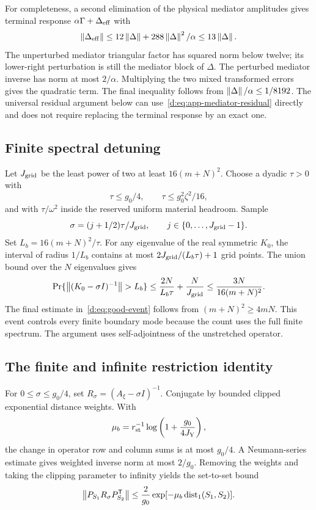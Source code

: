 For completeness, a second elimination of the physical mediator amplitudes gives terminal response $\alpha\Gamma+\Delta_{\rm eff}$ with
\begin{equation}\label{d:eq:app-effective-error}
 \left\lVert \Delta_{\rm eff}\right\rVert
 \le12\left\lVert \Delta\right\rVert+288\left\lVert \Delta\right\rVert^2/\alpha
 \le13\left\lVert \Delta\right\rVert.
\end{equation}
The unperturbed mediator triangular factor has squared norm below twelve; its lower-right perturbation is still the mediator block of $\Delta$. The perturbed mediator inverse has norm at most $2/\alpha$. Multiplying the two mixed transformed errors gives the quadratic term. The final inequality follows from $\left\lVert \Delta\right\rVert/\alpha\le1/8192$. The universal residual argument below can use~\eqref{d:eq:app-mediator-residual} directly and does not require replacing the terminal response by an exact one.

\subsection{Finite spectral detuning}

Let $J_{\rm grid}$ be the least power of two at least $16(m+N)^2$. Choose a dyadic $\tau>0$ with
\[
 \tau\le g_0/4,\qquad \tau\le g_0^2\zeta^2/16,
\]
and with $\tau/\omega^2$ inside the reserved uniform material headroom. Sample
\[
 \sigma=(j+1/2)\tau/J_{\rm grid},\qquad
 j\in\{0,\ldots,J_{\rm grid}-1\}.
\]
Set $L_b=16(m+N)^2/\tau$. For any eigenvalue of the real symmetric $K_0$, the interval of radius $1/L_b$ contains at most $2J_{\rm grid}/(L_b\tau)+1$ grid points. The union bound over the $N$ eigenvalues gives
\[
 \Pr\{\left\lVert (K_0-\sigma I)^{-1}\right\rVert>L_b\}
 \le\frac{2N}{L_b\tau}+\frac{N}{J_{\rm grid}}
 \le\frac{3N}{16(m+N)^2}.
\]
The final estimate in~\eqref{d:eq:good-event} follows from $(m+N)^2\ge4mN$. This event controls every finite boundary mode because the count uses the full finite spectrum. The argument uses self-adjointness of the unstretched operator.

\subsection{The finite and infinite restriction identity}

For $0\le\sigma\le g_0/4$, set $R_\sigma=(A_\xi-\sigma I)^{-1}$. Conjugate by bounded clipped exponential distance weights. With
\[
 \mu_b=r_{\rm st}^{-1}\log\left(1+\frac{g_0}{4J_{\rm Y}}\right),
\]
the change in operator row and column sums is at most $g_0/4$. A Neumann-series estimate gives weighted inverse norm at most $2/g_0$. Removing the weights and taking the clipping parameter to infinity yields the set-to-set bound
\begin{equation}\label{d:eq:app-set-resolvent}
 \left\lVert P_{S_1}R_\sigma P_{S_2}^{\mathsf T}\right\rVert
 \le\frac2{g_0}\exp[-\mu_b\operatorname{dist}_1(S_1,S_2)].
\end{equation}

